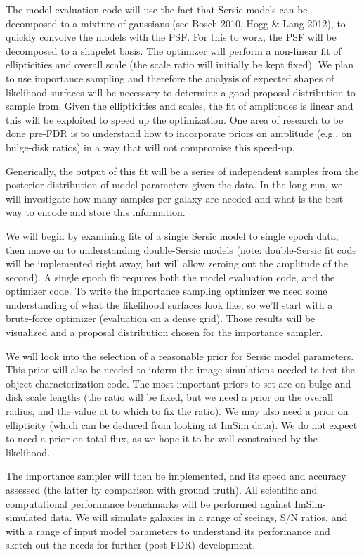 \documentclass[12pt]{article}
\begin{document}
The model evaluation code will use the fact that Sersic models can
be decomposed to a mixture of gaussians (see Bosch 2010, Hogg & Lang
2012), to quickly convolve the models with the PSF. For this to work,
the PSF will be decomposed to a shapelet basis. The optimizer will
perform a non-linear fit of ellipticities and overall scale (the
scale ratio will initially be kept fixed). We plan to use importance
sampling and therefore the analysis of expected shapes of likelihood
surfaces will be necessary to determine a good proposal distribution
to sample from. Given the ellipticities and scales, the fit of
amplitudes is linear and this will be exploited to speed up the
optimization. One area of research to be done pre-FDR is to understand
how to incorporate priors on amplitude (e.g., on bulge-disk ratios)
in a way that will not compromise this speed-up.

Generically, the output of this fit will be a series of independent
samples from the posterior distribution of model parameters given
the data. In the long-run, we will investigate how many samples per
galaxy are needed and what is the best way to encode and store this
information.

We will begin by examining fits of a single Sersic model to single
epoch data, then move on to understanding double-Sersic models (note:
double-Sersic fit code will be implemented right away, but will allow
zeroing out the amplitude of the second). A single epoch fit requires
both the model evaluation code, and the optimizer code. To write the
importance sampling optimizer we need some understanding of what the
likelihood surfaces look like, so we'll start with a brute-force
optimizer (evaluation on a dense grid). Those results will be
visualized and a proposal distribution chosen for the importance
sampler.

We will look into the selection of a reasonable prior for Sersic model
parameters. This prior will also be needed to inform the image
simulations needed to test the object characterization code.
The most important priors to set are on bulge and disk scale lengths
(the ratio will be fixed, but we need a prior on the overall radius,
and the value at to which to fix the ratio). We may also need a prior
on ellipticity (which can be deduced from looking at ImSim data). We
do not expect to need a prior on total flux, as we hope it to be
well constrained by the likelihood.

The importance sampler will then be implemented, and its speed and
accuracy assessed (the latter by comparison with ground truth). All
scientific and computational performance benchmarks will be performed
against ImSim-simulated data. We will simulate galaxies in a range of
seeings, S/N ratios, and with a range of input model parameters to
understand its performance and sketch out the needs for further
(post-FDR) development.
\end{document}
